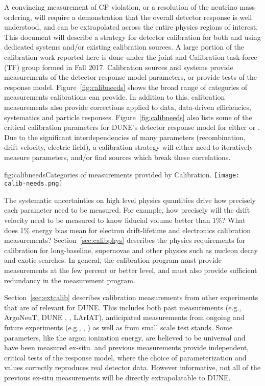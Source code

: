 A convincing measurement of CP violation, or a resolution of the neutrino mass ordering, will require a demonstration that the overall detector response is well understood, and can be extrapolated across the entire physics regions of interest.
This document will describe a strategy for detector calibration for both 
 and 
using dedicated  systems and/or existing calibration sources. A large portion of the calibration work reported here is done under the joint   and  Calibration task force (TF) group formed in Fall 2017. Calibration sources and systems provide measurements of the detector response model parameters, or provide tests of the response model.
Figure~\ref{fig:calibneeds} shows the broad range of categories of measurements calibrations can provide. In addition to this, calibration measurements also provide corrections applied to data, data-driven efficiencies, systematics and particle responses. Figure~\ref{fig:calibneeds} also lists some of the critical calibration parameters for DUNE's detector response model for either   or .
Due to the significant interdependencies of many parameters (recombination, drift velocity, electric field), a calibration strategy will either need to iteratively measure parameters, and/or find sources which break these correlations. 

\begin{dunefigure}{fig:calibneeds}{Categories of measurements provided by Calibration.}
\texttt{[image: calib-needs.png]}
\end{dunefigure}

The systematic uncertainties on high level physics quantities drive how precisely each parameter need to be measured. For example, how precisely will the drift velocity need to be measured to know fiducial volume better than \num{1}\%?  What does \num{1}\% energy bias mean for electron drift-lifetime and electronics calibration measurements? Section~\ref{sec:calibphys} describes the physics requirements for calibration for long-baseline, supernovae and other physics such as nucleon decay and exotic searches. In general, the calibration program must provide measurements at the few percent or better level, and must also provide sufficient redundancy in the measurement program.


Section~\ref{sec:extcalib} describes calibration measurements from 
other  experiments that are of relevant for DUNE. This includes both past measurements (e.g., ArgoNeuT, DUNE , , LArIAT), anticipated measurements from ongoing and future experiments (e.g., , ) as well as from small scale  test stands. Some parameters, like the argon ionization energy, are believed to be universal and have been measured ex-situ.  and previous measurements provide independent, critical tests of the response model, where the choice of parameterization and values correctly reproduces real detector data. However informative, not all of the previous ex-situ measurements will be directly extrapolatable to DUNE.

